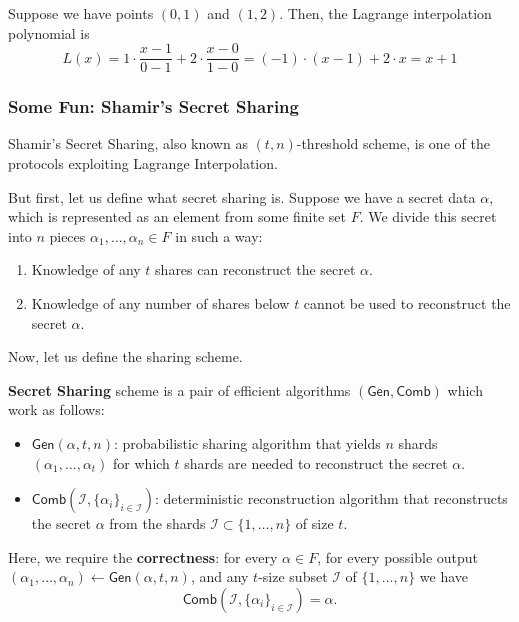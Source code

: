 \documentclass[../lecture-notes.tex]{subfiles}
\begin{document}
\begin{example}
    Suppose we have points $(0,1)$ and $(1,2)$. Then, the Lagrange interpolation polynomial is
    \begin{equation*}
        L(x) = 1 \cdot \frac{x-1}{0-1} + 2 \cdot \frac{x-0}{1-0} = (-1) \cdot (x-1) + 2 \cdot x = x + 1
    \end{equation*}
\end{example}

\subsubsection{Some Fun: Shamir's Secret Sharing}

Shamir's Secret Sharing, also known as $(t,n)$-threshold scheme, is one of the protocols exploiting Lagrange Interpolation. 

But first, let us define what secret sharing is. Suppose we have a secret data $\alpha$, which is represented as an element from some finite set $F$. We divide this secret into $n$ pieces $\alpha_1,\dots,\alpha_n \in F$ in such a way:
\begin{enumerate}
    \item Knowledge of any $t$ shares can reconstruct the secret $\alpha$.
    \item Knowledge of any number of shares below $t$ cannot be used to reconstruct the secret $\alpha$.
\end{enumerate}

Now, let us define the sharing scheme.

\begin{definition}
    \textbf{Secret Sharing} scheme is a pair of efficient algorithms $(\mathsf{Gen}, \mathsf{Comb})$ which work as follows:
    \begin{itemize}
        \item $\mathsf{Gen}(\alpha, t, n)$: probabilistic sharing algorithm that yields $n$ shards $(\alpha_1,\dots,\alpha_t)$ for which $t$ shards are needed to reconstruct the secret $\alpha$.
        \item $\mathsf{Comb}(\mathcal{I}, \{\alpha_i\}_{i \in \mathcal{I}})$: deterministic reconstruction algorithm that reconstructs the secret $\alpha$ from the shards $\mathcal{I} \subset \{1,\dots,n\}$ of size $t$.
    \end{itemize}

    Here, we require the \textbf{correctness}: for every $\alpha \in F$, for every possible output $(\alpha_1,\dots,\alpha_n) \gets \mathsf{Gen}(\alpha, t, n)$, and any $t$-size subset $\mathcal{I}$ of $\{1,\dots,n\}$ we have
    \begin{equation*}
        \mathsf{Comb}(\mathcal{I}, \{\alpha_i\}_{i \in \mathcal{I}}) = \alpha.
    \end{equation*}
\end{definition}
\end{document}
